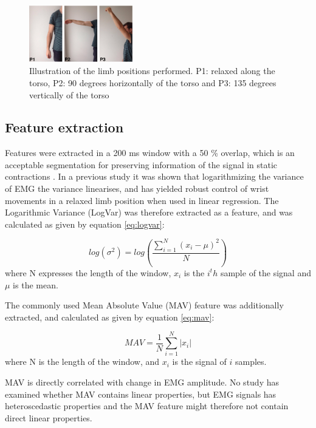 \begin{figure}[thpb]
	\centering
	\includegraphics[width=0.4\textwidth]{Figures/limb_pos}  %
	\caption{Illustration of the limb positions performed. P1: relaxed along the torso, P2: 90 degrees horizontally of the torso and P3: 135 degrees vertically of the torso}
	\label{fig:limbpositions}  %
\end{figure}

\subsection{Feature extraction}
Features were extracted in a 200 ms window with a 50 \% overlap, which is an acceptable segmentation for preserving information of the signal in static contractions \cite{Farfan2010}.
In a previous study \cite{hahne2014} it was shown that logarithmizing the variance of EMG the variance linearises, and has yielded robust control of wrist movements in a relaxed limb position when used in linear regression. The Logarithmic Variance (LogVar) was therefore extracted as a feature, and was calculated as given by equation \ref{eq:logvar}:

\begin{equation} \label{eq:logvar}
log(\sigma^2) = log(\frac{\sum\limits_{i=1}^N(x_i - \mu)^2}{N})
\end{equation}
where N expresses the length of the window, $x_i$ is the $i^th$ sample of the signal and $\mu$ is the mean. 

The commonly used Mean Absolute Value (MAV) feature was additionally extracted, and calculated as given by equation \ref{eq:mav}:

\begin{equation} \label{eq:mav}
MAV = \frac{1}{N}\sum\limits_{i=1}^N|x_i|
\end{equation}
where N is the length of the window, and $x_i$ is the signal of $i$ samples.

MAV is directly correlated with change in EMG amplitude. No study has examined whether MAV contains linear properties, but EMG signals has heteroscedastic properties \cite{rasool2012} and the MAV feature might therefore not contain direct linear properties.

